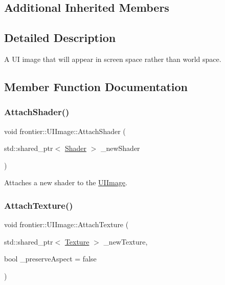 \subsection*{Additional Inherited Members}


\subsection{Detailed Description}
A UI image that will appear in screen space rather than world space. 

\subsection{Member Function Documentation}
\mbox{\label{classfrontier_1_1_u_i_image_a6e734a2bc1ab3869dbed9ad0161db03e}} 
\subsubsection{\texorpdfstring{Attach\+Shader()}{AttachShader()}}
{\footnotesize\ttfamily void frontier\+::\+U\+I\+Image\+::\+Attach\+Shader (\begin{DoxyParamCaption}\item[{std\+::shared\+\_\+ptr$<$ \hyperlink{classfrontier_1_1_shader}{Shader} $>$}]{\+\_\+new\+Shader }\end{DoxyParamCaption})}



Attaches a new shader to the \hyperlink{classfrontier_1_1_u_i_image}{U\+I\+Image}. 

\mbox{\label{classfrontier_1_1_u_i_image_a4a01988dfb00993a7e22de94bddb41ce}} 
\subsubsection{\texorpdfstring{Attach\+Texture()}{AttachTexture()}}
{\footnotesize\ttfamily void frontier\+::\+U\+I\+Image\+::\+Attach\+Texture (\begin{DoxyParamCaption}\item[{std\+::shared\+\_\+ptr$<$ \hyperlink{classfrontier_1_1_texture}{Texture} $>$}]{\+\_\+new\+Texture,  }\item[{bool}]{\+\_\+preserve\+Aspect = {\ttfamily false} }\end{DoxyParamCaption})}



